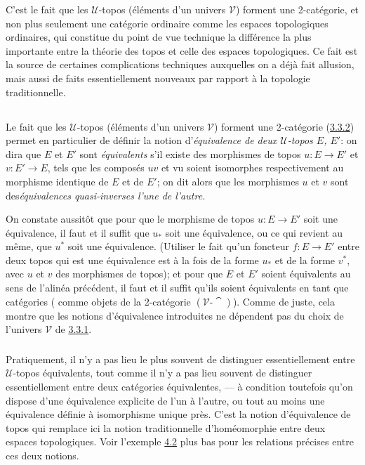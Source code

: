 \documentclass[10pt]{../fichiers-configuration-latex/smfart}
\begin{document}
C'est le fait que les $𝒰$-topos (éléments d'un univers
$𝒱$) forment une 2-catégorie, et non plus seulement une
catégorie ordinaire comme les espaces topologiques ordinaires, qui
constitue du point de vue technique la différence la plus
importante entre la théorie des topos et celle des espaces
topologiques. Ce fait est la source de certaines complications
techniques auxquelles on a déjà fait allusion, mais aussi de
faits essentiellement nouveaux par rapport à la topologie
traditionnelle.

\subsection{}
Le fait que les $𝒰$-topos (éléments d'un univers
$𝒱$) forment une 2-catégorie (\hyperref[IV.subsubsec3.3.2]{3.3.2})
permet en particulier de définir la notion d'\emph{équivalence de
deux $𝒰$-topos $E$, $E'$}: on dira que $E$ et $E'$ sont
\emph{équivalents} s'il existe des morphismes de topos
$u:E\rightarrow E'$ et $v:E'\rightarrow E$, tels que les composés
$uv$ et vu soient isomorphes respectivement au morphisme identique
de $E$ et de $E'$; on dit alors que les morphismes $u$ et $v$ sont
des\pageoriginale \emph{équivalences quasi-inverses l'une de
l'autre.}

On constate aussitôt que pour que le morphisme de topos
$u:E\rightarrow E'$ soit une équivalence, il faut et il suffit que
$u_{\ast}$ soit une équivalence, ou ce qui revient au même, que
$u^{\ast}$ soit une équivalence. (Utiliser le fait qu'un foncteur
$f:E\rightarrow E'$ entre deux topos qui est une équivalence est
à la fois de la forme $u_{\ast}$ et de la forme $v^{\ast}$, avec
$u$ et $v$ des morphismes de topos); et pour que $E$ et $E'$ soient
équivalents au sens de l'alinéa précédent, il faut et il
suffit qu'ils soient équivalents en tant que catégories (\ie
comme objets de la 2-catégorie $(𝒱\text{-}\cat)$). Comme
de juste, cela montre que les notions d'équivalence introduites ne
dépendent pas du choix de l'univers $𝒱$ de
\hyperref[IV.subsubsec3.3.1]{3.3.1}.

\subsubsection{}
Pratiquement, il n'y a pas lieu le plus souvent de distinguer
essentiellement entre $𝒰$-topos équivalents, tout comme il
n'y a pas lieu souvent de distinguer essentiellement entre deux
catégories équivalentes, --- à condition toutefois qu'on
dispose d'une équivalence explicite de l'un à l'autre, ou tout
au moins une équivalence définie à isomorphisme unique près.
C'est la notion d'équivalence de topos qui remplace ici la notion
traditionnelle d'homéomorphie entre deux espaces topologiques.
Voir l'exemple \hyperref[IV.subsec4.2]{4.2} plus bas pour les relations
précises entre ces deux notions.
\end{document}

